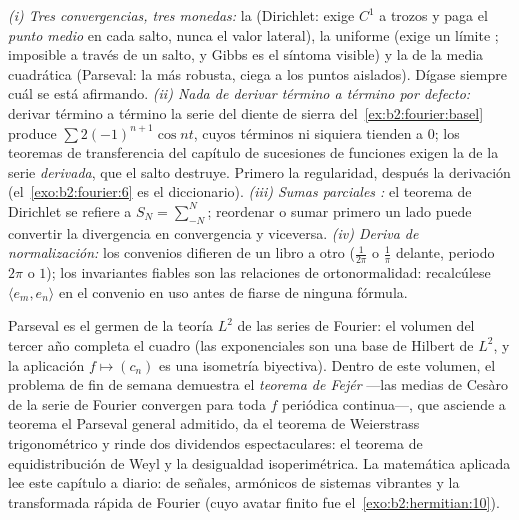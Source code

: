 \begin{remark}
\emph{(i) Tres convergencias, tres monedas:} la  (Dirichlet:
exige $C^1$ a trozos y paga el \emph{punto medio} en cada salto,
nunca el valor lateral), la uniforme (exige un límite ;
imposible a través de un salto, y Gibbs es el síntoma visible) y la
de la media cuadrática (Parseval: la más robusta, ciega a los puntos
aislados). Dígase siempre cuál se está afirmando. \emph{(ii) Nada de
derivar término a término por defecto:} derivar término a término la
serie del diente de sierra del~\cref{ex:b2:fourier:basel} produce
$\sum 2(-1)^{n+1}\cos nt$, cuyos términos ni siquiera tienden a $0$;
los teoremas de transferencia del capítulo de sucesiones de funciones
exigen la  de la serie \emph{derivada}, que el
salto destruye. Primero la regularidad, después la derivación (el~\cref{exo:b2:fourier:6} es el diccionario). \emph{(iii) Sumas
parciales :} el teorema de Dirichlet se refiere a $S_N =
\sum_{-N}^{N}$; reordenar o sumar primero un lado puede convertir la
divergencia en convergencia y viceversa. \emph{(iv) Deriva de
normalización:} los convenios difieren de un libro a otro
($\frac{1}{2\pi}$ o $\frac1\pi$ delante, periodo $2\pi$ o $1$); los
invariantes fiables son las relaciones de ortonormalidad:
recalcúlese $\langle e_m, e_n\rangle$ en el convenio en uso antes de
fiarse de ninguna fórmula.
\end{remark}

\begin{remark}
Parseval es el germen de la teoría $L^2$ de las series de Fourier: el
volumen del tercer año completa el cuadro (las exponenciales son una
base de Hilbert de $L^2$, y la aplicación $f \mapsto (c_n)$ es una
isometría biyectiva). Dentro de este volumen, el problema de fin de
semana demuestra el \emph{teorema de Fejér} ---las medias de
Cesàro de la serie de Fourier convergen  para toda
$f$ periódica continua---, que asciende a teorema el Parseval general
admitido, da el teorema de Weierstrass trigonométrico y rinde dos
dividendos espectaculares: el teorema de equidistribución de Weyl y
la desigualdad isoperimétrica. La matemática aplicada lee este
capítulo a diario:  de señales, armónicos de sistemas
vibrantes y la transformada rápida de Fourier (cuyo avatar finito fue
el~\cref{exo:b2:hermitian:10}).
\end{remark}

